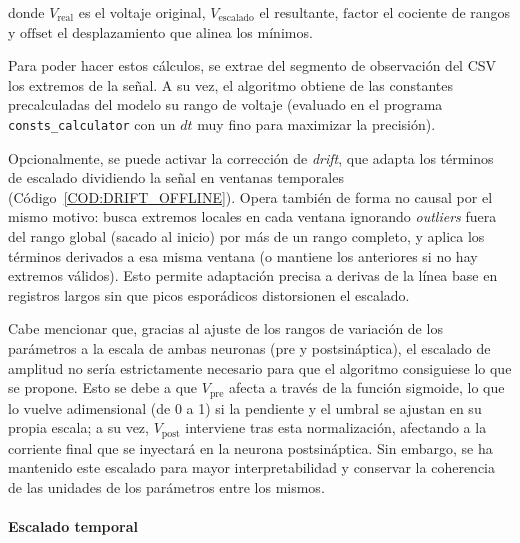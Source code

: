 \noindent donde $V_{\mathrm{real}}$ es el voltaje original, $V_{\mathrm{escalado}}$ el resultante, $\mathrm{factor}$ el cociente de rangos y $\mathrm{offset}$ el desplazamiento que alinea los mínimos.

Para poder hacer estos cálculos, se extrae del segmento de observación del CSV los extremos de la señal. A su vez, el algoritmo obtiene de las constantes precalculadas del modelo su rango de voltaje (evaluado en el programa \texttt{consts\_calculator} con un $dt$ muy fino para maximizar la precisión).

Opcionalmente, se puede activar la corrección de \textit{drift}, que adapta los términos de escalado dividiendo la señal en ventanas temporales (Código~\ref{COD:DRIFT_OFFLINE}). Opera también de forma no causal por el mismo motivo: busca extremos locales en cada ventana ignorando \textit{outliers} fuera del rango global (sacado al inicio) por más de un rango completo, y aplica los términos derivados a esa misma ventana (o mantiene los anteriores si no hay extremos válidos). Esto permite adaptación precisa a derivas de la línea base en registros largos sin que picos esporádicos distorsionen el escalado.

Cabe mencionar que, gracias al ajuste de los rangos de variación de los parámetros a la escala de ambas neuronas (pre y postsináptica), el escalado de amplitud no sería estrictamente necesario para que el algoritmo consiguiese lo que se propone. Esto se debe a que \(V_{\mathrm{pre}}\) afecta a través de la función sigmoide, lo que lo vuelve adimensional (de 0 a 1) si la pendiente y el umbral se ajustan en su propia escala; a su vez, \(V_{\mathrm{post}}\) interviene tras esta normalización, afectando a la corriente final que se inyectará en la neurona postsináptica. Sin embargo, se ha mantenido este escalado para mayor interpretabilidad y conservar la coherencia de las unidades de los parámetros entre los mismos.

\paragraph{Escalado temporal}

